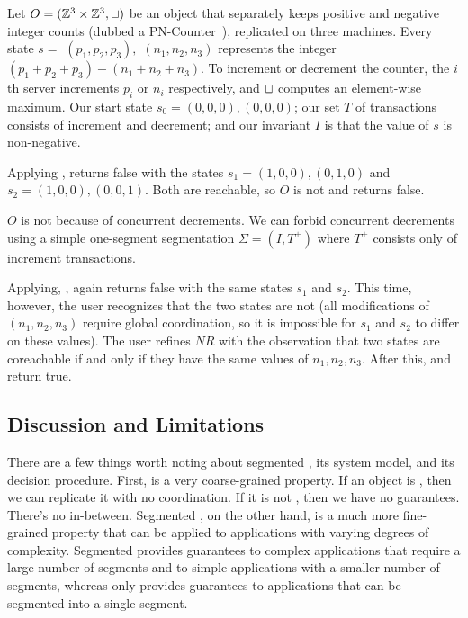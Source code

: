 \begin{example}
  Let $O = (\mathbb{Z}^3 \times \mathbb{Z}^3, \sqcup)$ be an object that separately keeps positive and negative integer counts (dubbed a
  PN-Counter~\cite{shapiro2011comprehensive}), replicated on three machines.
  Every state $s = $ $(p_1, p_2, p_3),$ $(n_1, n_2, n_3)$ represents the
  integer $(p_1 + p_2 + p_3) - (n_1 + n_2 + n_3)$. To increment or decrement
  the counter, the $i$th server increments $p_i$ or $n_i$ respectively, and
  $\sqcup$ computes an element-wise maximum. Our start state $s_0 = (0, 0, 0),
  (0, 0, 0)$; our set $T$ of transactions consists of increment and decrement;
  and our invariant $I$ is that the value of $s$ is non-negative.

  Applying , \IsIclosed{} returns false
  with the states $s_1 = (1, 0, 0), (0, 1, 0)$ and $s_2 = (1, 0, 0), (0, 0,
  1)$. Both are reachable, so $O$ is not \sTIconfluent{} and
   returns false.
  \begin{revisions}
    $O$ is not \sTIconfluent{} because of concurrent decrements. We can forbid
    concurrent decrements using a simple one-segment segmentation $\Sigma = (I,
    T^+)$ where $T^+$ consists only of increment transactions.
  \end{revisions}
  Applying, ,
  \IsIclosed{} again returns false with the same states $s_1$ and $s_2$. This time,
  however, the user recognizes that the two states are not
   (all modifications of $(n_1, n_2, n_3)$ require global
  coordination, so it is impossible for $s_1$ and $s_2$ to differ on these
  values).
  The user refines $NR$ with the observation that two
  states are coreachable if and only if they have the same values of $n_1, n_2,
  n_3$. After this, \IsIclosed{} and
   return true.
\end{example}

\subsection{Discussion and Limitations}
There are a few things worth noting about segmented \invariantconfluence{}, its
system model, and its decision procedure.
%
First, \invariantconfluence{} is a very coarse-grained property. If an object
is \invariantconfluent{}, then we can replicate it with no coordination. If it
is not \invariantconfluent{}, then we have no guarantees. There's no
in-between.  Segmented \invariantconfluence{}, on the other hand, is a much
more fine-grained property that can be applied to applications with varying
degrees of complexity. Segmented \invariantconfluence{} provides guarantees to
complex applications that require a large number of segments and to simple
applications with a smaller number of segments, whereas \invariantconfluence{}
only provides guarantees to applications that can be segmented into a single
segment.

